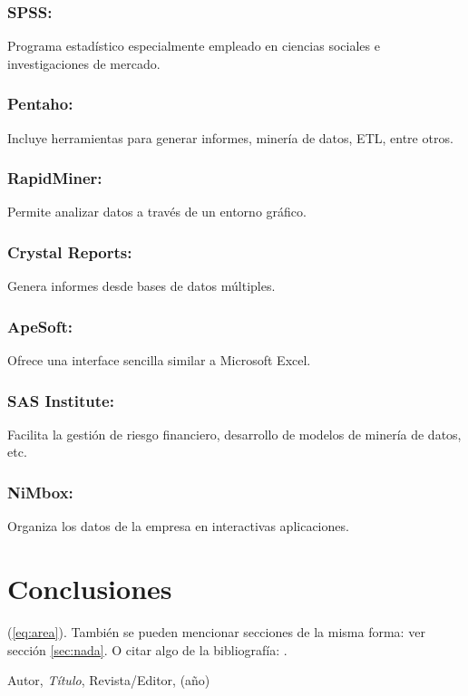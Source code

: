 \subsubsection{SPSS: }\label{sec:nada2}  
Programa estadístico especialmente empleado en ciencias sociales e investigaciones de mercado.

\subsubsection{Pentaho: }\label{sec:nada2}  
Incluye herramientas para generar informes, minería de datos, ETL, entre otros.

\subsubsection{RapidMiner: }\label{sec:nada2}  
Permite analizar datos a través de un entorno gráfico.

\subsubsection{Crystal Reports: }\label{sec:nada2}  
Genera informes desde bases de datos múltiples.

\subsubsection{ApeSoft: }\label{sec:nada2}  
Ofrece una interface sencilla similar a Microsoft Excel.

\subsubsection{SAS Institute: }\label{sec:nada2}  
Facilita la gestión de riesgo financiero, desarrollo de modelos de minería de datos, etc.

\subsubsection{NiMbox: }\label{sec:nada2}  
Organiza los datos de la empresa en interactivas aplicaciones.


\section{Conclusiones}

(\ref{eq:area}).
También se pueden mencionar secciones de la misma forma: ver sección
\ref{sec:nada}. O citar algo de la bibliografía: \cite{Cd94}.


\begin{thebibliography}{99}

 Autor, \emph{Título}, Revista/Editor, (año)

\end{thebibliography}


